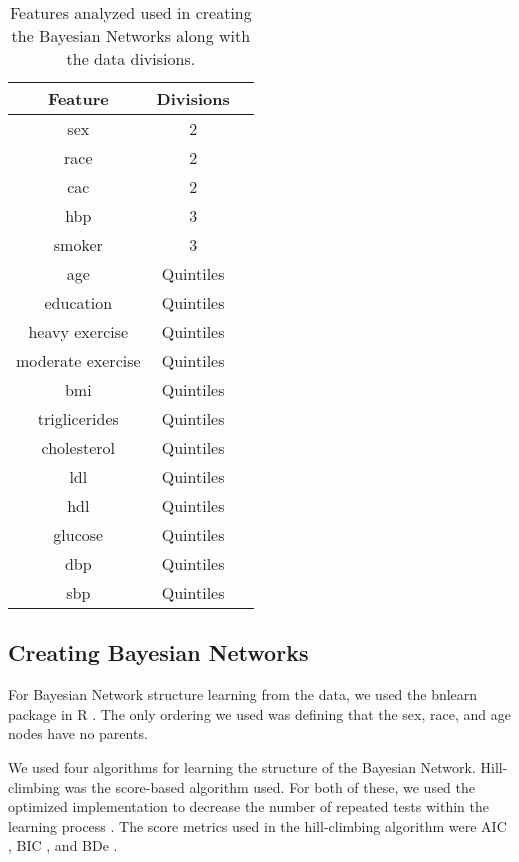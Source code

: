\documentclass[letterpaper]{article}
\begin{document}
\begin{table}{}
\centering
\begin{tabular}{ |c|c|c| } 
 \hline
 Feature & Divisions\\ 
 \hline
 sex & 2\\
 \hline
 race & 2\\
 \hline
 cac & 2\\
 \hline
 hbp & 3\\
 \hline
 smoker & 3\\
 \hline
 age & Quintiles\\
 \hline
 education & Quintiles\\
 \hline
 heavy exercise & Quintiles\\
 \hline
 moderate exercise & Quintiles\\
 \hline
 bmi & Quintiles\\
 \hline
 triglicerides & Quintiles\\
 \hline
 cholesterol & Quintiles\\
 \hline
 ldl & Quintiles\\
 \hline
 hdl & Quintiles\\
 \hline
 glucose & Quintiles\\
 \hline
 dbp & Quintiles\\ 
 \hline
 sbp & Quintiles\\ 
 \hline
 
 
 \hline
\end{tabular}
\caption{Features analyzed used in creating the Bayesian Networks along with the data divisions.}
\label{tab:table1}

\end{table}
 
\subsection{Creating Bayesian Networks}

For Bayesian Network structure learning from the data, we used the bnlearn package in R \cite{Scutari2009, scutari2017package}. The only ordering we used was defining that the sex, race, and age nodes have no parents. 

We used four algorithms for learning the structure of the Bayesian Network. Hill-climbing was the score-based algorithm used. For both of these, we used the optimized implementation to decrease the number of repeated tests within the learning process \cite{Daly}. The score metrics used in the hill-climbing algorithm were AIC \cite{Akaike1974}, BIC \cite{Schwarz1978}, and BDe \cite{Heckerman1995}. 
 
\end{document}
